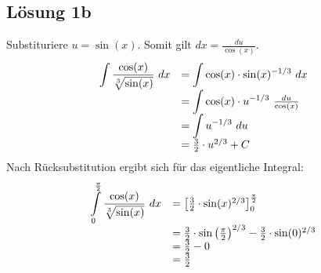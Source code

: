 \documentclass[main.tex]{subfiles}
\begin{document}
\subsection{Lösung 1b}
Substituriere $u=\sin( x)$. Somit gilt $dx=\frac{du}{\cos( x)}$.
\begin{equation*}
    \begin{array}{ c l }
    {\displaystyle \int \frac{\cos( x)}{\sqrt[3]{\sin( x)}} \ dx} & ={\displaystyle \int \cos( x) \cdotp \sin( x)^{-1/3} \ dx}\\
    & ={\displaystyle \int \cos( x) \cdotp u^{-1/3} \ }\frac{du}{\cos( x)}\\
    & ={\displaystyle \int u^{-1/3} \ du}\\
    & =\frac{3}{2} \cdotp u^{2/3} +C
    \end{array}
\end{equation*}
Nach Rücksubstitution ergibt sich für das eigentliche Integral:
\begin{equation*}
    \begin{array}{ c l }
    {\displaystyle \int\limits _{0}^{\frac{\pi }{2}}\frac{\cos( x)}{\sqrt[3]{\sin( x)}} \ dx} & =\left[\frac{3}{2} \cdotp \sin( x)^{2/3}\right]_{0}^{\frac{\pi }{2}}\\
    & =\frac{3}{2} \cdotp \sin\left(\frac{\pi }{2}\right)^{2/3} -\frac{3}{2} \cdotp \sin( 0)^{2/3}\\
    & =\frac{3}{2} -0\\
    & =\frac{3}{2}
    \end{array}
\end{equation*}
\end{document}
